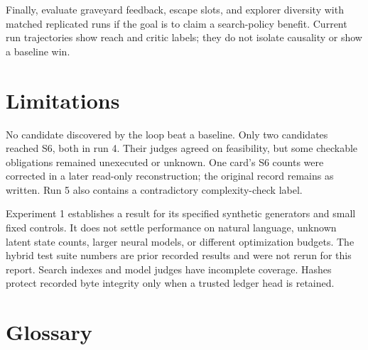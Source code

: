 Finally, evaluate graveyard feedback, escape slots, and explorer diversity with matched replicated runs if the goal is to claim a search-policy benefit. Current run trajectories show reach and critic labels; they do not isolate causality or show a baseline win.

\section{Limitations}

No candidate discovered by the loop beat a baseline. Only two candidates reached S6, both in run 4. Their judges agreed on feasibility, but some checkable obligations remained unexecuted or unknown. One card's S6 counts were corrected in a later read-only reconstruction; the original record remains as written. Run 5 also contains a contradictory complexity-check label.

Experiment 1 establishes a result for its specified synthetic generators and small fixed controls. It does not settle performance on natural language, unknown latent state counts, larger neural models, or different optimization budgets. The hybrid test suite numbers are prior recorded results and were not rerun for this report. Search indexes and model judges have incomplete coverage. Hashes protect recorded byte integrity only when a trusted ledger head is retained.

\appendix
\section{Glossary}

